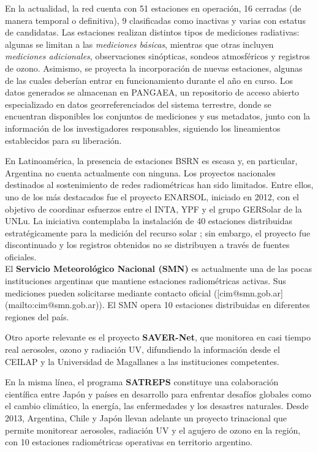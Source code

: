 En la actualidad, la red cuenta con 51 estaciones en operación, 16 cerradas (de manera temporal o definitiva), 9 clasificadas como inactivas y varias con estatus de candidatas. Las estaciones realizan distintos tipos de mediciones radiativas: algunas se limitan a las \textit{mediciones básicas}, mientras que otras incluyen \textit{mediciones adicionales}, observaciones sinópticas, sondeos atmosféricos y registros de ozono. Asimismo, se proyecta la incorporación de nuevas estaciones, algunas de las cuales deberían entrar en funcionamiento durante el año en curso. Los datos generados se almacenan en PANGAEA, un repositorio de acceso abierto especializado en datos georreferenciados del sistema terrestre, donde se encuentran disponibles los conjuntos de mediciones y sus metadatos, junto con la información de los investigadores responsables, siguiendo los lineamientos establecidos para su liberación.

En Latinoamérica, la presencia de estaciones BSRN es escasa y, en particular, Argentina no cuenta actualmente con ninguna. Los proyectos nacionales destinados al sostenimiento de redes radiométricas han sido limitados. Entre ellos, uno de los más destacados fue el proyecto ENARSOL, iniciado en 2012, con el objetivo de coordinar esfuerzos entre el INTA, YPF y el grupo GERSolar de la UNLu. La iniciativa contemplaba la instalación de 40 estaciones distribuidas estratégicamente para la medición del recurso solar \cite{aristegui2012}; sin embargo, el proyecto fue discontinuado y los registros obtenidos no se distribuyen a través de fuentes oficiales.\\

El \textbf{Servicio Meteorológico Nacional (SMN)} es actualmente una de las pocas instituciones argentinas que mantiene estaciones radiométricas activas. Sus mediciones pueden solicitarse mediante contacto oficial ([cim@smn.gob.ar](mailto:cim@smn.gob.ar)). El SMN opera 10 estaciones distribuidas en diferentes regiones del país.

Otro aporte relevante es el proyecto \textbf{SAVER-Net}, que monitorea en casi tiempo real aerosoles, ozono y radiación UV, difundiendo la información desde el CEILAP y la Universidad de Magallanes a las instituciones competentes.

En la misma línea, el programa \textbf{SATREPS} constituye una colaboración científica entre Japón y países en desarrollo para enfrentar desafíos globales como el cambio climático, la energía, las enfermedades y los desastres naturales. Desde 2013, Argentina, Chile y Japón llevan adelante un proyecto trinacional que permite monitorear aerosoles, radiación UV y el agujero de ozono en la región, con 10 estaciones radiométricas operativas en territorio argentino.\\

